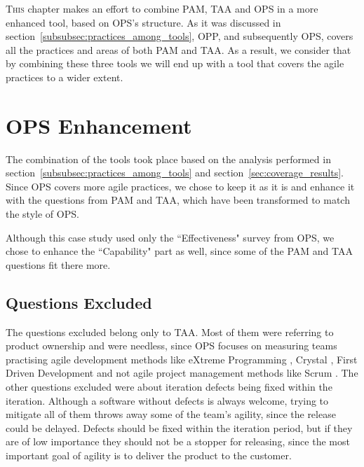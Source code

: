 \lettrine[lines=2, loversize=-0.1, lraise=0.1]{T}{his} chapter makes an effort to combine \ac{PAM}, \ac{TAA} and \ac{OPS} in a more enhanced tool, based on \ac{OPS}'s structure. As it was discussed in section~\ref{subsubsec:practices_among_tools}, \ac{OPP}, and subsequently \ac{OPS}, covers all the practices and areas of both \ac{PAM} and \ac{TAA}. As a result, we consider that by combining these three tools we will end up with a tool that covers the agile practices to a wider extent.

\section{\ac{OPS} Enhancement}
The combination of the tools took place based on the analysis performed in section~\ref{subsubsec:practices_among_tools} and section~\ref{sec:coverage_results}. Since \ac{OPS} covers more agile practices, we chose to keep it as it is and enhance it with the questions from \ac{PAM} and \ac{TAA}, which have been transformed to match the style of \ac{OPS}.

Although this case study used only the ``Effectiveness" survey from \ac{OPS}, we chose to enhance the ``Capability" part as well, since some of the \ac{PAM} and \ac{TAA} questions fit there more.

\subsection{Questions Excluded}
The questions excluded belong only to \ac{TAA}. Most of them were referring to product ownership and were needless, since \ac{OPS} focuses on measuring teams practising agile development methods like eXtreme Programming \cite{Beck:2004:EPE:1076267}, Crystal \cite{Cockburn:2004:CCH:1406822}, First Driven Development \cite{Palmer:2001:PGF:600044} and not agile project management methods like Scrum \cite{scrum}. The other questions excluded were about iteration defects being fixed within the iteration. Although a software without defects is always welcome, trying to mitigate all of them throws away some of the team's agility, since the release could be delayed. Defects should be fixed within the iteration period, but if they are of low importance they should not be a stopper for releasing, since the most important goal of agility is to deliver the product to the customer.

